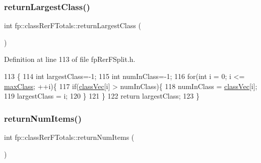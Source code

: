 \subsubsection{\texorpdfstring{return\+Largest\+Class()}{returnLargestClass()}}
{\footnotesize\ttfamily int fp\+::class\+Rer\+F\+Totals\+::return\+Largest\+Class (\begin{DoxyParamCaption}{ }\end{DoxyParamCaption})\hspace{0.3cm}{\ttfamily [inline]}}



Definition at line 113 of file fp\+Rer\+F\+Split.\+h.


\begin{DoxyCode}
113                                            \{
114                 \textcolor{keywordtype}{int} largestClass=-1; 
115                 \textcolor{keywordtype}{int} numInClass=-1;
116                 \textcolor{keywordflow}{for}(\textcolor{keywordtype}{int} i = 0; i <= \hyperlink{classfp_1_1classRerFTotals_a365f8e9aca77f5794fa1bc5fdd504670}{maxClass}; ++i)\{
117                     \textcolor{keywordflow}{if}(\hyperlink{classfp_1_1classRerFTotals_a4a7b583fc52d7631771f5dd04d20a68a}{classVec}[i] > numInClass)\{
118                         numInClass = \hyperlink{classfp_1_1classRerFTotals_a4a7b583fc52d7631771f5dd04d20a68a}{classVec}[i];
119                         largestClass = i;
120                     \}
121                 \}
122                 \textcolor{keywordflow}{return} largestClass;
123             \}
\end{DoxyCode}
\mbox{\label{classfp_1_1classRerFTotals_a6a61995fc7a7a4914493fbef192da417}} 
\subsubsection{\texorpdfstring{return\+Num\+Items()}{returnNumItems()}}
{\footnotesize\ttfamily int fp\+::class\+Rer\+F\+Totals\+::return\+Num\+Items (\begin{DoxyParamCaption}{ }\end{DoxyParamCaption})\hspace{0.3cm}{\ttfamily [inline]}}




